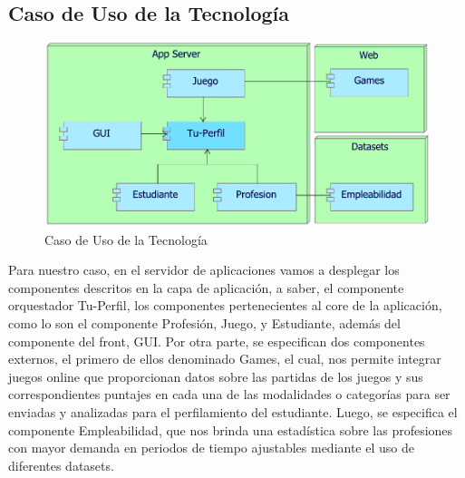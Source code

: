 
\subsection{Caso  de  Uso de la Tecnología}
\begin{figure}[h!]
	\centering
	\includegraphics[width=.7\linewidth]{imgs/puntos_vista/tecnologia/uso.pdf}
	\caption{Caso de Uso de la Tecnología}
\end{figure}

Para nuestro caso, en el servidor de aplicaciones vamos a desplegar los componentes descritos en la capa de aplicación, a saber, el componente orquestador Tu-Perfil, los componentes pertenecientes al core de la aplicación, como lo son el componente Profesión, Juego, y Estudiante, además del componente del front, GUI. Por otra parte, se especifican dos componentes externos, el primero de ellos denominado Games, el cual, nos permite integrar juegos online que proporcionan datos sobre las partidas de los juegos y sus correspondientes puntajes en cada una de las modalidades o categorías para ser enviadas y analizadas para el perfilamiento del estudiante. Luego, se especifica el componente Empleabilidad, que nos brinda una estadística sobre las profesiones con mayor demanda en periodos de tiempo ajustables mediante el uso de diferentes datasets. 